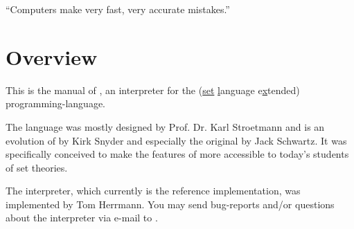 


\globalDate{\today}







\begin{titlepage}
\maketitle

\vfill

\begin{center}
\Large
``Computers make very fast, very accurate mistakes.''
\end{center}

\vfill
\tableofcontents
\end{titlepage}

\section{Overview}

This is the manual of \setlX, an interpreter for the \SetlX{} (\underline{set} \underline{l}anguage e\underline{x}tended) programming-language.

The \SetlX{} language was mostly designed by Prof. Dr. Karl Stroetmann and is an evolution of \SetlTwo{} by Kirk Snyder and especially the original \Setl{} by Jack Schwartz. It was specifically conceived to make the features of \Setl{} more accessible to today's students of set theories.

The \setlX{} interpreter, which currently is the \SetlX{} reference implementation, was implemented by Tom Herrmann. You may send bug-reports and\slash{}or questions about the \setlX{} interpreter via e-mail to .

